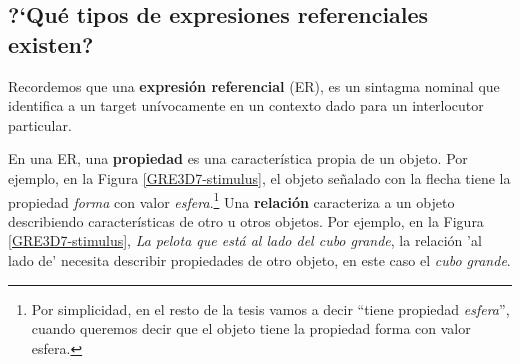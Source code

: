 

\subsection{?`Qu\'e tipos de expresiones referenciales existen?}
\label{sec:tipos_er}

Recordemos que una {\bf expresi\'on referencial} (ER), es un sintagma nominal que identifica a un target un\'ivocamente en un contexto dado para un interlocutor particular.

En una ER, una \textbf{propiedad} es una caracter\'istica propia de un objeto. Por ejemplo, en la Figura \ref{GRE3D7-stimulus}, el objeto se\~nalado con la flecha tiene la propiedad {\it forma} con valor {\it esfera}.\footnote{Por simplicidad, en el resto de la tesis vamos a decir ``tiene propiedad {\it esfera}'', cuando queremos decir que el objeto tiene la propiedad forma con valor esfera.} Una \textbf{relaci\'on} caracteriza a un objeto describiendo caracter\'isticas de otro u otros objetos. Por ejemplo, en la Figura \ref{GRE3D7-stimulus}, {\it La pelota que est\'a al lado del cubo grande}, la relaci\'on 'al lado de' necesita describir propiedades de otro objeto, en este caso el {\it cubo grande}.


